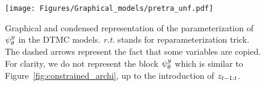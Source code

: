 \begin{figure}[htbp!]
  \centering
  \texttt{[image: Figures/Graphical\_models/pretra\_unf.pdf]}
  \caption{Graphical and condensed representation of the parameterization of $\psi^{y}_{\theta}$ in the DTMC models. \emph{r.t.} stands for reparameterization trick. 
  The dashed arrows represent the fact that some variables are copied. For clarity, we do not represent the block $\psi^{y}_{\theta}$ which is similar
  to Figure~\ref{fig:constrained_archi}, up 
  to the introduction of $z_{t-1:t}$.
  }
  \label{fig:pretrain_dmtmc}
\end{figure}
